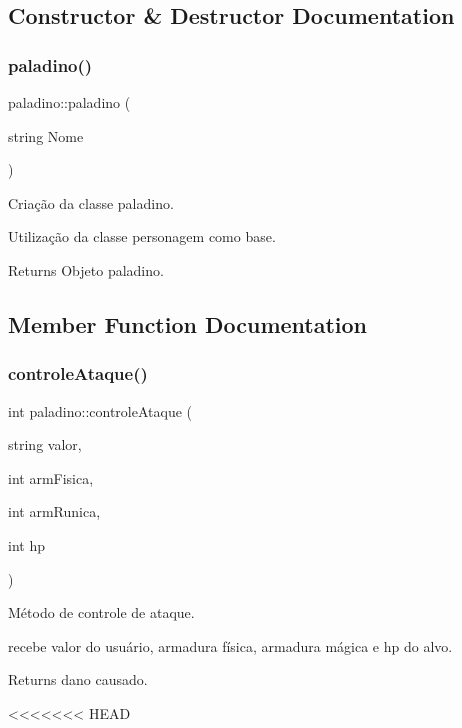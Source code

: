 \subsection{Constructor \& Destructor Documentation}
\mbox{\label{classpaladino_a312e5f9a43967aa31e34128051646277}} 
\subsubsection{\texorpdfstring{paladino()}{paladino()}}
{\footnotesize\ttfamily paladino\+::paladino (\begin{DoxyParamCaption}\item[{string}]{Nome }\end{DoxyParamCaption})}



Criação da classe paladino. 

Utilização da classe personagem como base. \begin{DoxyReturn}{Returns}
Objeto paladino. 
\end{DoxyReturn}


\subsection{Member Function Documentation}
\mbox{\label{classpaladino_a059fd05922c2adcbd87743b9c3552c11}} 
\subsubsection{\texorpdfstring{controle\+Ataque()}{controleAtaque()}}
{\footnotesize\ttfamily int paladino\+::controle\+Ataque (\begin{DoxyParamCaption}\item[{string}]{valor,  }\item[{int}]{arm\+Fisica,  }\item[{int}]{arm\+Runica,  }\item[{int}]{hp }\end{DoxyParamCaption})}



Método de controle de ataque. 

recebe valor do usuário, armadura física, armadura mágica e hp do alvo. \begin{DoxyReturn}{Returns}
dano causado. 
\end{DoxyReturn}
<<<<<<< HEAD
\mbox{\label{classpaladino_a028019d72c919de0589cccdfed402a18}} 
